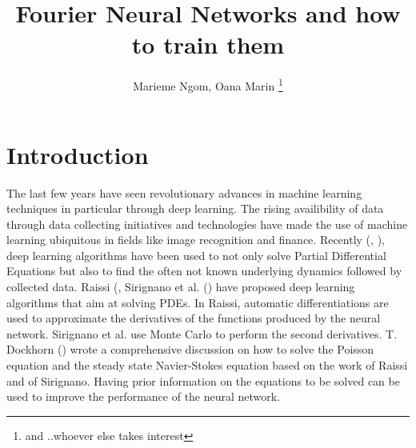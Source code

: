 \documentclass[11pt]{article}
\begin{document}

\title{Fourier Neural Networks and how to train them}
\author{Marieme Ngom, Oana Marin \footnote{and ..whoever else takes interest}}
\maketitle
\begin{abstract}

\end{abstract}




\linenumbers

\section{Introduction}

The last few years have seen revolutionary advances in machine learning techniques in particular through deep learning. The rising availibility of data through data collecting initiatives and technologies have made the use of machine learning ubiquitous in fields like image recognition and finance. Recently (\cite{Raissi}, \cite{Sirignano}), deep learning algorithms have been used to not only solve Partial Differential Equations but also to find the often not known underlying dynamics followed by collected data. Raissi (\cite{Raissi}, Sirignano et al. (\cite{Sirignano}) have proposed deep learning algorithms that aim at solving PDEs. In Raissi, automatic differentiations are used to approximate the derivatives of the functions produced by the neural network. Sirignano et al. use Monte Carlo to perform the second  derivatives. T. Dockhorn (\cite{Dockhorn}) wrote a comprehensive discussion on how to solve the Poisson equation and the steady state Navier-Stokes equation based on the work of Raissi and of Sirignano. Having prior information on the equations to be solved can be used to improve the performance of the neural network.\\
\end{document}
